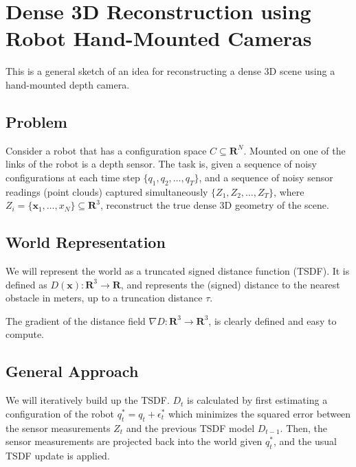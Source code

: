 \documentclass{article}
\begin{document}
\newcommand{\bx}{\mathbf{x}}
\newcommand{\ddq}{\frac{\partial}{\partial \epsilon_t}}
\newcommand{\dxdq}{\frac{\partial \bx}{\partial \epsilon_t}}

\section{Dense 3D Reconstruction using Robot Hand-Mounted Cameras}

This is a general sketch of an idea for reconstructing a dense 3D scene using a
hand-mounted depth camera.

\subsection{Problem}

Consider a robot that has a configuration space $C \subseteq \mathbf{R}^N$.
Mounted on one of the links of the robot is a depth sensor. The task is, given a
sequence of noisy configurations at each time step $\{q_1, q_2, \ldots,
q_T\}$, and a sequence of noisy sensor readings (point clouds) captured
simultaneously $\{Z_1, Z_2, \ldots, Z_T\}$, where $Z_i = \{\bx_1, \ldots, x_N\}
\subseteq \mathbf{R}^3$, reconstruct the true dense 3D geometry of the scene. 

\subsection{World Representation}

We will represent the world as a truncated signed distance function (TSDF). It
is defined as $D(\bx) : \mathbf{R}^3 \to \mathbf{R}$, and represents the
(signed) distance to the nearest obstacle in meters, up to a truncation distance $\tau$.

The gradient of the distance field $\nabla D : \mathbf{R}^3 \to \mathbf{R}^3$,
is clearly defined and easy to compute.

\subsection{General Approach}

We will iteratively build up the TSDF. $D_t$ is calculated by first estimating a
configuration of the robot $q^*_t = q_t + \epsilon^*_t$ which minimizes the
squared error between the sensor measurements $Z_t$ and the previous TSDF model
$D_{t - 1}$.  Then, the sensor measurements are projected back into the world
given $q^*_t$, and the usual TSDF update is applied.
\end{document}

